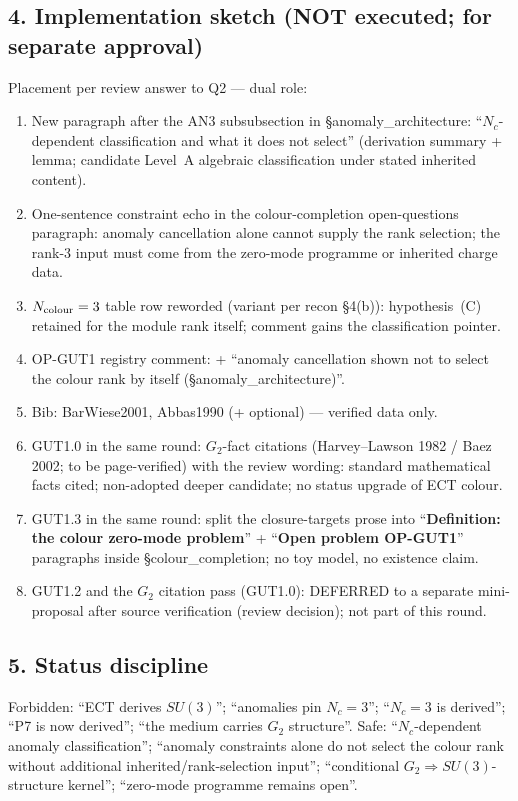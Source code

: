 \subsection*{4. Implementation sketch (NOT executed; for separate
approval)}
Placement per review answer to Q2 --- dual role:
\begin{enumerate}
  \item New paragraph after the AN3 subsubsection in
    \S anomaly\_architecture:
    ``$N_c$-dependent classification and what it does not select''
    (derivation summary + lemma; candidate Level~A algebraic
    classification under stated inherited content).
  \item One-sentence constraint echo in the colour-completion
    open-questions paragraph: anomaly cancellation alone cannot
    supply the rank selection; the rank-3 input must come from the
    zero-mode programme or inherited charge data.
  \item $N_{\rm colour}=3$ table row reworded (variant per recon
    \S4(b)): hypothesis~(C) retained for the module rank itself;
    comment gains the classification pointer.
  \item OP-GUT1 registry comment: + ``anomaly cancellation shown
    not to select the colour rank by itself
    (\S anomaly\_architecture)''.
  \item Bib: BarWiese2001, Abbas1990 (+ optional) --- verified
    data only.
  \item GUT1.0 in the same round: $G_2$-fact citations
    (Harvey--Lawson 1982 / Baez 2002; to be page-verified) with
    the review wording: standard mathematical facts cited;
    non-adopted deeper candidate; no status upgrade of ECT colour.
  \item GUT1.3 in the same round: split the closure-targets prose
    into ``\textbf{Definition: the colour zero-mode problem}'' +
    ``\textbf{Open problem OP-GUT1}'' paragraphs inside
    \S colour\_completion; no toy model, no existence claim.
  \item GUT1.2 and the $G_2$ citation pass (GUT1.0): DEFERRED to a
    separate mini-proposal after source verification (review
    decision); not part of this round.
\end{enumerate}

\subsection*{5. Status discipline}
Forbidden: ``ECT derives $SU(3)$''; ``anomalies pin $N_c=3$'';
``$N_c=3$ is derived''; ``P7 is now derived''; ``the medium
carries $G_2$ structure''.
Safe: ``$N_c$-dependent anomaly classification'';
``anomaly constraints alone do not select the colour rank without
additional inherited/rank-selection input'';
``conditional $G_2\Rightarrow SU(3)$-structure kernel'';
``zero-mode programme remains open''.


